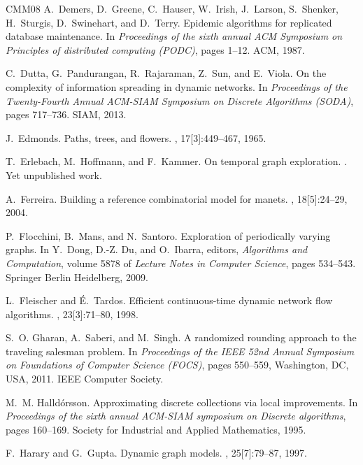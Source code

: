 \documentclass[oribibl, 11pt]{llncs}
\begin{document}
\begin{thebibliography}{CMM{\etalchar{+}}08}
A.~Demers, D.~Greene, C.~Hauser, W.~Irish, J.~Larson, S.~Shenker, H.~Sturgis,
  D.~Swinehart, and D.~Terry.
\newblock Epidemic algorithms for replicated database maintenance.
\newblock In {\em Proceedings of the sixth annual ACM Symposium on Principles
  of distributed computing (PODC)}, pages 1--12. ACM, 1987.

C.~Dutta, G.~Pandurangan, R.~Rajaraman, Z.~Sun, and E.~Viola.
\newblock On the complexity of information spreading in dynamic networks.
\newblock In {\em Proceedings of the Twenty-Fourth Annual ACM-SIAM Symposium on
  Discrete Algorithms (SODA)}, pages 717--736. SIAM, 2013.

J.~Edmonds.
\newblock Paths, trees, and flowers.
, 17[3]:449--467, 1965.

T.~Erlebach, M.~Hoffmann, and F.~Kammer.
\newblock On temporal graph exploration.
.
\newblock Yet unpublished work.

A.~Ferreira.
\newblock Building a reference combinatorial model for manets.
, 18[5]:24--29, 2004.

P.~Flocchini, B.~Mans, and N.~Santoro.
\newblock Exploration of periodically varying graphs.
\newblock In Y.~Dong, D.-Z. Du, and O.~Ibarra, editors, {\em Algorithms and
  Computation}, volume 5878 of {\em Lecture Notes in Computer Science}, pages
  534--543. Springer Berlin Heidelberg, 2009.

L.~Fleischer and {\'E}.~Tardos.
\newblock Efficient continuous-time dynamic network flow algorithms.
, 23[3]:71--80, 1998.

S.~O. Gharan, A.~Saberi, and M.~Singh.
\newblock A randomized rounding approach to the traveling salesman problem.
\newblock In {\em Proceedings of the IEEE 52nd Annual Symposium on Foundations
  of Computer Science (FOCS)}, pages 550--559, Washington, DC, USA, 2011. IEEE
  Computer Society.

M.~M. Halld{\'o}rsson.
\newblock Approximating discrete collections via local improvements.
\newblock In {\em Proceedings of the sixth annual ACM-SIAM symposium on
  Discrete algorithms}, pages 160--169. Society for Industrial and Applied
  Mathematics, 1995.

F.~Harary and G.~Gupta.
\newblock Dynamic graph models.
, 25[7]:79--87, 1997.


\end{thebibliography}
\end{document}
